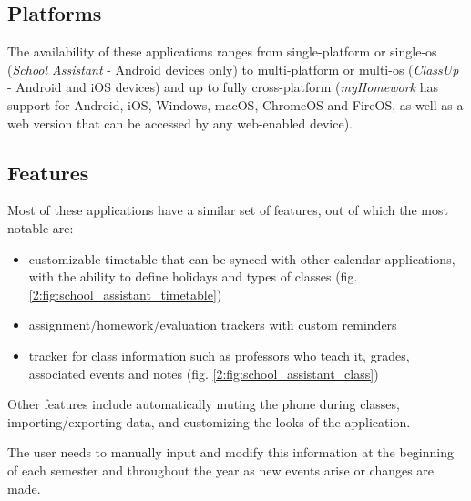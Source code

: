     \subsection{Platforms} \label{2:generic_apps_platforms}
        The availability of these applications ranges from single-platform or single-\acrshort{os} (\textit{School Assistant} - Android devices only) to multi-platform or multi-\acrshort{os} (\textit{ClassUp} - Android and iOS devices) and up to fully cross-platform (\textit{myHomework} has support for Android, iOS, Windows, macOS, ChromeOS and FireOS, as well as a web version that can be accessed by any web-enabled device).
        
    \subsection{Features} \label{2:generic_apps_features}
        Most of these applications have a similar set of features, out of which the most notable are:
        
        \begin{itemize}
            \item customizable timetable that can be synced with other calendar applications, with the ability to define holidays and types of classes (fig. \ref{2:fig:school_assistant_timetable})
            \item assignment/homework/evaluation trackers with custom reminders
            \item tracker for class information such as professors who teach it, grades, associated events and notes (fig. \ref{2:fig:school_assistant_class})
        \end{itemize}
        
        Other features include automatically muting the phone during classes, importing/exporting data, and customizing the looks of the application.
        
        The user needs to manually input and modify this information at the beginning of each semester and throughout the year as new events arise or changes are made.
        
